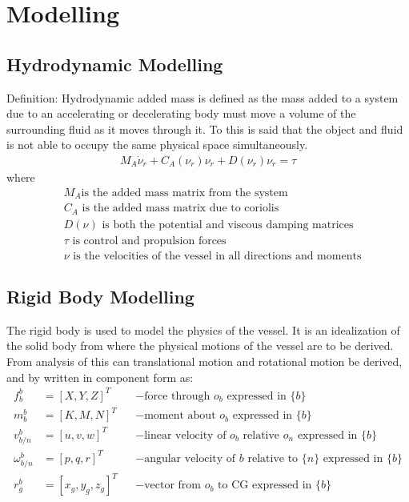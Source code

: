 \chapter{Modelling}

\section{Hydrodynamic Modelling}
Definition: Hydrodynamic added mass is defined as the mass added to a system due to an accelerating or decelerating body must move a volume of the surrounding fluid as it moves through it. To this is said that the object and fluid is not able to occupy the same physical space simultaneously.
\begin{align}
M_A \dot \nu_r + C_A(\nu_r)\nu_r + D(\nu_r)\nu_r = \tau
\label{eq:hydmodel}
\end{align}
where
\begin{align}
&M_A \text{is the added mass matrix from the system}\nonumber\\
&C_A \text{ is the added mass matrix due to coriolis}\nonumber\\
&D(\nu) \text{ is both the potential and viscous damping matrices}\nonumber\\
&\tau \text{ is control and propulsion forces}\nonumber\\
&\nu \text{ is the velocities of the vessel in all directions and moments}
\end{align}

\section{Rigid Body Modelling}
The rigid body is used to model the physics of the vessel. It is an idealization of the solid body from where the physical motions of the vessel are to be derived. From analysis of this can translational motion and rotational motion be derived, and by \citep{fossen} written in component form as:
\begin{align}
f^b_b &= [X,Y,Z]^T & &- \text{force through } o_b \text{ expressed in } \{b\}\\
m^b_b &= [K,M,N]^T & &- \text{moment about } o_b \text{ expressed in } \{b\}\\
v^b_{b/n} &= [u,v,w]^T & &- \text{linear velocity of } o_b \text{ relative } o_n \text{ expressed in } \{b\}\\
\omega^b_{b/n} &= [p,q,r]^T & &- \text{angular velocity of } {b} \text{ relative to } \{n\} \text{ expressed in } \{b\}\\
r^b_g &= [x_g,y_g,z_g]^T & &- \text{vector from } o_b \text{ to CG expressed in } \{b\}
\end{align}

